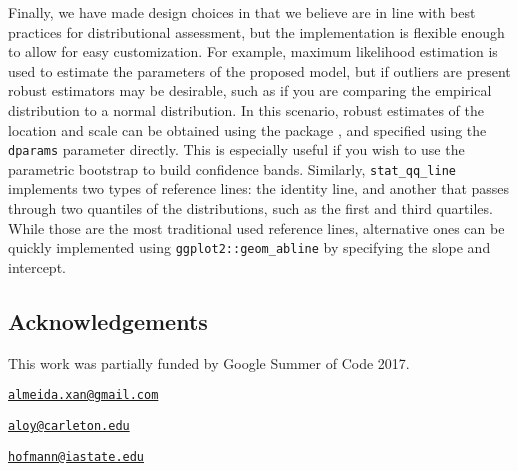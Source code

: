 Finally, we have made design choices in  that we believe
are in line with best practices for distributional assessment, but the
implementation is flexible enough to allow for easy customization. For
example, maximum likelihood estimation is used to estimate the
parameters of the proposed model, but if outliers are present robust
estimators may be desirable, such as if you are comparing the empirical
distribution to a normal distribution. In this scenario, robust
estimates of the location and scale can be obtained using the
 package \citep{robustbase}, and specified using the
\texttt{dparams} parameter directly. This is especially useful if you
wish to use the parametric bootstrap to build confidence bands.
Similarly, \texttt{stat\_qq\_line} implements two types of reference
lines: the identity line, and another that passes through two quantiles
of the distributions, such as the first and third quartiles. While those
are the most traditional used reference lines, alternative ones can be
quickly implemented using \texttt{ggplot2::geom\_abline} by specifying
the slope and intercept.



\subsection{Acknowledgements}\label{acknowledgements}

This work was partially funded by Google Summer of Code 2017.

\address{%
Alexandre Almeida\\
University of Campinas\\
Institute of Computing\\ Campinas, Brazil 13083-852\\
}
\href{mailto:almeida.xan@gmail.com}{\nolinkurl{almeida.xan@gmail.com}}

\address{%
Adam Loy\\
Carleton College\\
Department of Mathematics and Statistics\\ Northfield, MN 55057\\
}
\href{mailto:aloy@carleton.edu}{\nolinkurl{aloy@carleton.edu}}

\address{%
Heike Hofmann\\
Iowa State University\\
Department of Statistics\\ Ames, IA 50011-1210\\
}
\href{mailto:hofmann@iastate.edu}{\nolinkurl{hofmann@iastate.edu}}

